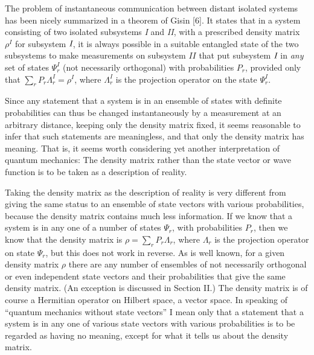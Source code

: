\documentclass[12pt]{article}
\begin{document}
The problem of instantaneous communication between distant isolated systems has been nicely summarized in a theorem of Gisin [6].  It states that in a system consisting of two  isolated subsystems {\em I} and {\em II}, with a prescribed density matrix $\rho^I$ for subsystem ${\hbox{\em I}}$, it is always possible in a suitable entangled state of the two subsystems to make measurements on subsystem $II$ that put subsystem ${\hbox{\em I}}$ in {\hbox{\em any}} set of states $\Psi^I_r$ (not  necessarily orthogonal) with probabilities $P_r$, provided only that $\sum_r P_r
\Lambda^I_r=\rho^I$, where $\Lambda^I_r$ is the projection operator on the state  $\Psi^I_r$.    

Since any statement that a system is in an ensemble of states with definite probabilities can thus be changed instantaneously by a measurement at an arbitrary distance, keeping only the density matrix fixed, it seems reasonable to infer that such statements are meaningless, and that only the density matrix has meaning.  That is, it  seems  worth considering yet another interpretation of quantum mechanics:  The density matrix rather than the state vector or wave function  is to be taken as a description of reality.  

Taking the density matrix as the description of reality is very different from giving the same status to an ensemble of  state vectors with various probabilities, because the density matrix contains much less information.    If we know that a system is in any one of a number of  states $\Psi_r$, with  probabilities $P_r$, then we know that the density matrix is $\rho=\sum_r P_r\Lambda_r$, where $\Lambda_r$ is the projection operator on state  
$\Psi_r$, but this does not work in reverse.  As is well known, for a given density matrix $\rho$ there are any number of ensembles of not necessarily orthogonal or even independent state vectors and their probabilities that give the same density matrix.  (An exception is discussed in Section II.)      The density matrix is of course a Hermitian operator on  Hilbert space, a  vector space.  In speaking of  ``quantum mechanics without state vectors''  I mean only that a statement that a system is in any one of various state vectors with various probabilities is to be regarded as having no meaning, except for what it tells us about the density matrix.  
\end{document}
